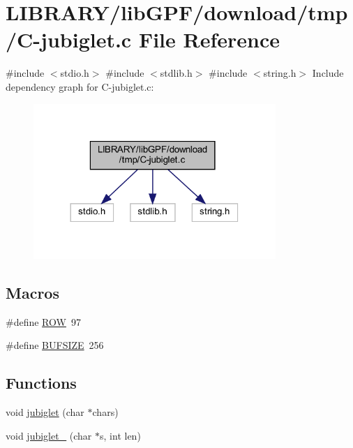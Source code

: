 \hypertarget{C-jubiglet_8c}{}\section{L\+I\+B\+R\+A\+R\+Y/lib\+G\+P\+F/download/tmp/\+C-\/jubiglet.c File Reference}
\label{C-jubiglet_8c}
{\ttfamily \#include $<$stdio.\+h$>$}\newline
{\ttfamily \#include $<$stdlib.\+h$>$}\newline
{\ttfamily \#include $<$string.\+h$>$}\newline
Include dependency graph for C-\/jubiglet.c\+:
\nopagebreak
\begin{figure}[H]
\begin{center}
\leavevmode
\includegraphics[width=260pt]{C-jubiglet_8c__incl}
\end{center}
\end{figure}
\subsection*{Macros}
\begin{DoxyCompactItemize}
\item 
\#define \hyperlink{C-jubiglet_8c_ac6f18a9e1d00b4637522b1b469a92021}{R\+OW}~97
\item 
\#define \hyperlink{C-jubiglet_8c_aeca034f67218340ecb2261a22c2f3dcd}{B\+U\+F\+S\+I\+ZE}~256
\end{DoxyCompactItemize}
\subsection*{Functions}
\begin{DoxyCompactItemize}
\item 
void \hyperlink{C-jubiglet_8c_adc484767e979a59ef703547d98fab384}{jubiglet} (char $\ast$chars)
\item 
void \hyperlink{C-jubiglet_8c_a6a4a6c766aa968996649c44415282c91}{jubiglet\+\_\+} (char $\ast$s, int len)
\end{DoxyCompactItemize}


